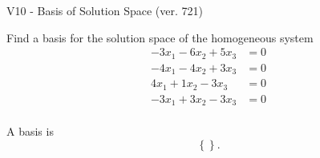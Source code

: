 \begin{exercise}
  \begin{exerciseTitle}V10 - Basis of Solution Space (ver. 721)\end{exerciseTitle}
  \begin{exerciseStatement}
    Find a basis for the solution space of the homogeneous system 
\begin{align*}
 -3 x_ 1 -6 x_ 2 + 5 x_ 3 &= 0  \\ 
  -4 x_ 1 -4 x_ 2 + 3 x_ 3 &= 0  \\ 
  4 x_ 1 + 1 x_ 2 -3 x_ 3 &= 0  \\ 
  -3 x_ 1 + 3 x_ 2 -3 x_ 3 &= 0  \\ 
 \end{align*}


 
  \end{exerciseStatement}

  \begin{exerciseAnswer}
   A basis is   
\[\left\{\right\}.\]

  


  \end{exerciseAnswer}
\end{exercise}